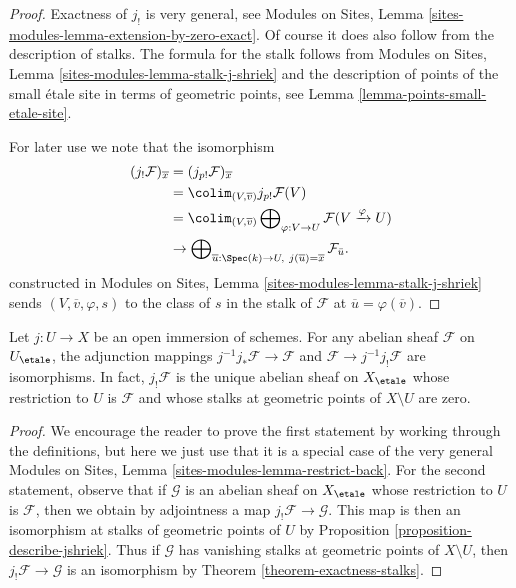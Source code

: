 \begin{proof}
Exactness of $j_!$ is very general, see Modules on Sites, 
Lemma \ref{sites-modules-lemma-extension-by-zero-exact}.
Of course it does also follow from the description of stalks.
The formula for the stalk follows from
Modules on Sites, Lemma \ref{sites-modules-lemma-stalk-j-shriek}
and the description of points of the small \'etale site
in terms of geometric points, see Lemma \ref{lemma-points-small-etale-site}.

\medskip\noindent
For later use we note that the isomorphism
\begin{align*}
(j_!\mathcal{F})_{\overline{x}}
& =
(j_{p!}\mathcal{F})_{\overline{x}} \\
& =
\colim_{(V, \overline{v})} j_{p!}\mathcal{F}(V) \\
& =
\colim_{(V, \overline{v})}
\bigoplus\nolimits_{\varphi : V \to U}
\mathcal{F}(V \xrightarrow{\varphi} U) \\
& \to
\bigoplus\nolimits_{\overline{u} : \Spec(k) \to U,\ j(\overline{u}) =
\overline{x}} \mathcal{F}_{\bar{u}}.
\end{align*}
constructed in Modules on Sites, Lemma \ref{sites-modules-lemma-stalk-j-shriek}
sends $(V, \overline{v}, \varphi, s)$ to the class of $s$ in the stalk
of $\mathcal{F}$ at $\overline{u} = \varphi(\overline{v})$.
\end{proof}

\begin{lemma}
\label{lemma-jshriek-open}
Let $j : U \to X$ be an open immersion of schemes. For any
abelian sheaf $\mathcal{F}$ on $U_\etale$, the adjunction mappings
$j^{-1}j_*\mathcal{F} \to \mathcal{F}$ and
$\mathcal{F} \to j^{-1}j_!\mathcal{F}$ are isomorphisms.
In fact, $j_!\mathcal{F}$ is the unique abelian sheaf on $X_\etale$
whose restriction to $U$ is $\mathcal{F}$ and whose stalks at
geometric points of $X \setminus U$ are zero.
\end{lemma}

\begin{proof}
We encourage the reader to prove the first statement by working through the
definitions, but here we just use that it is a special case of the very general
Modules on Sites, Lemma \ref{sites-modules-lemma-restrict-back}.
For the second statement, observe that if $\mathcal{G}$ is an abelian sheaf
on $X_\etale$ whose restriction to $U$ is $\mathcal{F}$, then we obtain
by adjointness a map $j_!\mathcal{F} \to \mathcal{G}$. This map
is then an isomorphism at stalks of geometric points of $U$ by
Proposition \ref{proposition-describe-jshriek}.
Thus if $\mathcal{G}$ has vanishing stalks at geometric points
of $X \setminus U$, then $j_!\mathcal{F} \to \mathcal{G}$ is an
isomorphism by Theorem \ref{theorem-exactness-stalks}.
\end{proof}

